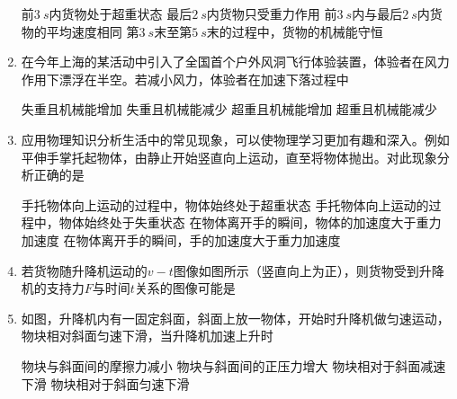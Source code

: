 \begin{enumerate}[leftmargin=0em]
\fourchoices
{前$ 3\ s $内货物处于超重状态}
{最后$ 2\ s $内货物只受重力作用}
{前$ 3\ s $内与最后$ 2\ s $内货物的平均速度相同}
{第$ 3\ s $末至第$ 5\ s $末的过程中，货物的机械能守恒}

\item 
{}
在今年上海的某活动中引入了全国首个户外风洞飞行体验装置，体验者在风力作用下漂浮在半空。若减小风力，体验者在加速下落过程中 


\fourchoices
{失重且机械能增加}
{失重且机械能减少}
{超重且机械能增加}
{超重且机械能减少}





\item 
{}
应用物理知识分析生活中的常见现象，可以使物理学习更加有趣和深入。例如平伸手掌托起物体，由静止开始竖直向上运动，直至将物体抛出。对此现象分析正确的是 

\fourchoices
{手托物体向上运动的过程中，物体始终处于超重状态}
{手托物体向上运动的过程中，物体始终处于失重状态}
{在物体离开手的瞬间，物体的加速度大于重力加速度}
{在物体离开手的瞬间，手的加速度大于重力加速度}


\item 
{}
若货物随升降机运动的$ v-t $图像如图所示（竖直向上为正），则货物受到升降机的支持力$ F $与时间$ t $关系的图像可能是 
\begin{figure}[h!]
\centering

\end{figure}

\item 
{}
如图，升降机内有一固定斜面，斜面上放一物体，开始时升降机做匀速运动，物块相对斜面匀速下滑，当升降机加速上升时 
\begin{figure}[h!]
\centering

\end{figure}

\fourchoices
{物块与斜面间的摩擦力减小}
{物块与斜面间的正压力增大}
{物块相对于斜面减速下滑}
{物块相对于斜面匀速下滑}








\end{enumerate}



